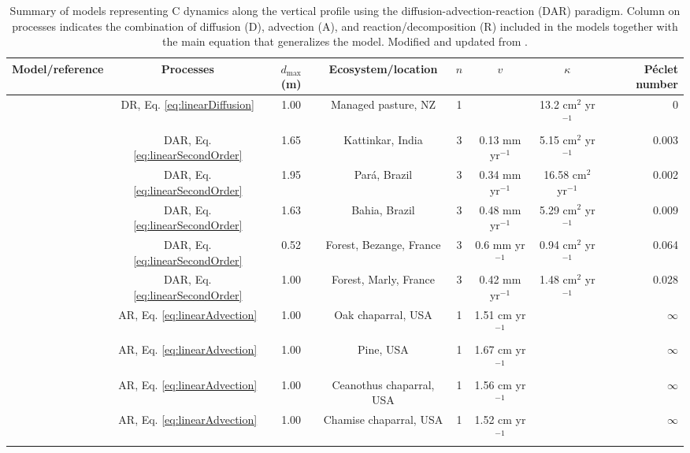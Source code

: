 \documentclass[11pt, oneside, a4paper]{article}   	%
\begin{document}
\begin{landscape}

\begin{table}[h]
   \centering
   \caption{Summary of models representing C dynamics along the vertical profile using the diffusion-advection-reaction (DAR) paradigm. Column on processes indicates the combination of diffusion (D), advection (A), and reaction/decomposition (R) included in the models together with the main equation that generalizes the model. Modified and updated from \citet{Koven2013BGS}.} \small
   \begin{tabular}{@{} lccccccr @{}} %
      \toprule
      Model/reference    & Processes & $d_{\mathrm{max}}$ (m) & Ecosystem/location & $n$ & $v$ & $\kappa$ & P\'eclet number\\
      \midrule
      \citet{OBrien1978} & DR, Eq. \ref{eq:linearDiffusion} & 1.00 & Managed pasture, NZ & 1 & & 13.2 cm$^2$ yr$^{-1}$ & 0 \\
      \citet{Elzein1995}   & DAR, Eq. \ref{eq:linearSecondOrder} & 1.65 & Kattinkar, India & 3 & 0.13 mm yr$^{-1}$ & 5.15  cm$^2$ yr$^{-1}$ & 0.003 \\
      \citet{Elzein1995}   & DAR, Eq. \ref{eq:linearSecondOrder} & 1.95 & Par\'a, Brazil  & 3 & 0.34 mm yr$^{-1}$ & 16.58  cm$^2$ yr$^{-1}$  & 0.002 \\
      \citet{Elzein1995}   & DAR, Eq. \ref{eq:linearSecondOrder} & 1.63 & Bahia, Brazil & 3 & 0.48 mm yr$^{-1}$ & 5.29  cm$^2$ yr$^{-1}$ & 0.009 \\
      \citet{Elzein1995}   & DAR, Eq. \ref{eq:linearSecondOrder} & 0.52 & Forest, Bezange, France & 3 & 0.6 mm yr$^{-1}$ & 0.94  cm$^2$ yr$^{-1}$ & 0.064 \\
      \citet{Elzein1995}   & DAR, Eq. \ref{eq:linearSecondOrder} & 1.00 & Forest, Marly, France & 3 & 0.42 mm yr$^{-1}$ & 1.48  cm$^2$ yr$^{-1}$ & 0.028 \\
      \citet{Feng1999}  & AR, Eq. \ref{eq:linearAdvection}  & 1.00 & Oak chaparral, USA & 1 & 1.51 cm yr$^{-1}$ & & $\infty$ \\
      \citet{Feng1999}  & AR,  Eq. \ref{eq:linearAdvection}  & 1.00 & Pine, USA & 1 & 1.67 cm yr$^{-1}$ & & $\infty$ \\
      \citet{Feng1999}  & AR, Eq. \ref{eq:linearAdvection}  & 1.00 & Ceanothus chaparral, USA & 1 & 1.56 cm yr$^{-1}$ & & $\infty$ \\
      \citet{Feng1999}  & AR, Eq. \ref{eq:linearAdvection}  & 1.00 & Chamise chaparral, USA & 1 & 1.52 cm yr$^{-1}$ & & $\infty$ \\

\end{tabular}
\end{table}
\end{landscape}
\end{document}
